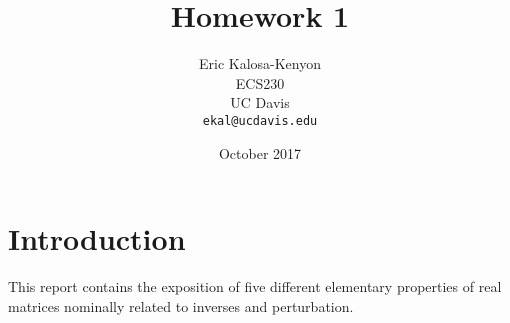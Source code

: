 \documentclass[12pt,fleqn,leqno,letterpaper]{article}
\title{Homework 1}
\author{Eric Kalosa-Kenyon\\
\small{ECS230}\\
\small{UC Davis}\\
\small{\texttt{ekal@ucdavis.edu}}
}
\date{October 2017}
\begin{document}
\maketitle



% 


\section{Introduction}
This report contains the exposition of five different elementary properties of
real matrices nominally related to inverses and perturbation.
\end{document}
